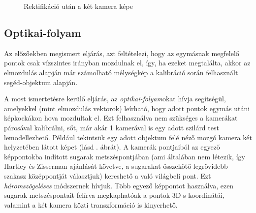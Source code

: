 \begin{figure}[tbh]
  \centering
{}
  \caption{Rektifikáció után a két kamera képe \label{fig:stereo-calibration-after}}
\end{figure}

\subsection{Optikai-folyam}

Az előzőekben megismert eljárás, azt feltételezi, hogy az egymásnak megfelelő pontok csak vízszintes irányban mozdulnak el, így, ha ezeket megtalálta, akkor az elmozdulás alapján már számolható mélységkép a kalibráció során felhasznált segéd-objektum alapján.

A most ismertetésre kerülő eljárás, az \textit{optikai-folyam}okat hívja segítségül, amelyekkel (mint elmozdulás vektorok) leírható, hogy adott pontok egymás utáni képkockákon hova mozdultak el. Ezt felhasználva nem szükséges a kamerákat párosával kalibrálni, sőt, már akár 1 kamerával is egy adott szilárd test lemodellezhető. Például tekintsük egy adott objektum felé néző mozgó kamera két helyzetében látott képet (lásd . ábrát). A kamerák pontjaiból az egyező képpontokba indított sugarak metszéspontjában (ami általában nem létezik, így Hartley és Zisserman \cite{HZ} ajánlását követve, a sugarakat összekötő legrövidebb szakasz középpontját választjuk) kereshető a való világbeli pont. Ezt \textit{háromszögeléses} módszernek hívjuk. Több egyező képpontot használva, ezen sugarak metszéspontait felírva megkaphatóak a pontok 3D-s koordinátái, valamint a két kamera közti transzformáció is kinyerhető. 

